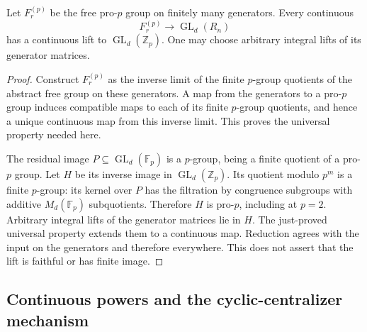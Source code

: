 \begin{theorem}\label{thm:free-pro-p-lift}
Let $F_r^{(p)}$ be the free pro-$p$ group on finitely many generators. Every continuous
\[
 F_r^{(p)}\longrightarrow\operatorname{GL}_d(R_n)
\]
has a continuous lift to $\operatorname{GL}_d(\mathbb Z_p)$. One may choose arbitrary integral lifts of its generator matrices.
\end{theorem}
\begin{proof}
Construct $F_r^{(p)}$ as the inverse limit of the finite $p$-group quotients of the abstract free group on these generators. A map from the generators to a pro-$p$ group induces compatible maps to each of its finite $p$-group quotients, and hence a unique continuous map from this inverse limit. This proves the universal property needed here.

The residual image $P\subseteq\operatorname{GL}_d(\mathbb F_p)$ is a $p$-group, being a finite quotient of a pro-$p$ group. Let $H$ be its inverse image in $\operatorname{GL}_d(\mathbb Z_p)$. Its quotient modulo $p^m$ is a finite $p$-group: its kernel over $P$ has the filtration by congruence subgroups with additive $M_d(\mathbb F_p)$ subquotients. Therefore $H$ is pro-$p$, including at $p=2$. Arbitrary integral lifts of the generator matrices lie in $H$. The just-proved universal property extends them to a continuous map. Reduction agrees with the input on the generators and therefore everywhere. This does not assert that the lift is faithful or has finite image.
\end{proof}

\subsection{Continuous powers and the cyclic-centralizer mechanism}

